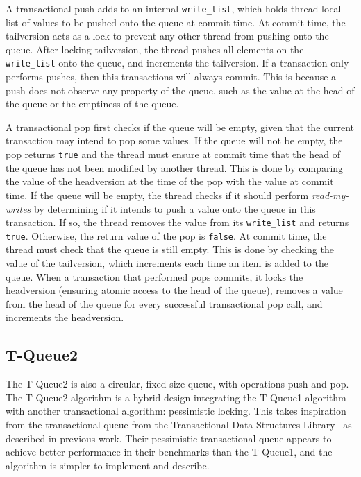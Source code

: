 A transactional push adds to an internal \texttt{write\_list}, which holds thread-local list of values to be pushed onto the queue at commit time. At commit time, the tailversion acts as a lock to prevent any other thread from pushing onto the queue. After locking tailversion, the thread pushes all elements on the \texttt{write\_list} onto the queue, and increments the tailversion.
If a transaction only performs pushes, then this transactions will always commit. This is because a push does not observe any property of the queue, such as the value at the head of the queue or the emptiness of the queue. 

A transactional pop first checks if the queue will be empty, given that the current transaction may intend to pop some values. If the queue will not be empty, the pop returns \texttt{true} and the thread must ensure at commit time that the head of the queue has not been modified by another thread. This is done by comparing the value of the headversion at the time of the pop with the value at commit time. 
If the queue will be empty, the thread checks if it should perform \emph{read-my-writes} by determining if it intends to push a value onto the queue in this transaction. If so, the thread removes the value from its \texttt{write\_list} and returns \texttt{true}. Otherwise, the return value of the pop is \texttt{false}. At commit time, the thread must check that the queue is still empty. This is done by checking the value of the tailversion, which increments each time an item is added to the queue.
When a transaction that performed pops commits, it locks the headversion (ensuring atomic access to the head of the queue), removes a value from the head of the queue for every successful transactional pop call, and increments the headversion.


\subsection{T-Queue2}
The T-Queue2 is also a circular, fixed-size queue, with operations push and pop. The T-Queue2 algorithm is a hybrid design integrating the T-Queue1 algorithm with another transactional algorithm: pessimistic locking. This takes inspiration from the transactional queue from the Transactional Data Structures Library~\cite{tdsl} as described in previous work. Their pessimistic transactional queue appears to achieve better performance in their benchmarks than the T-Queue1, and the algorithm is simpler to implement and describe. 

